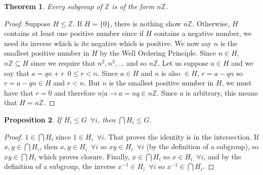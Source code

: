 \documentclass{article}
\newcommand{\Z}{\mathbb{Z}}
\newtheorem{theorem}{Theorem}[section]
\newtheorem{proposition}[theorem]{Proposition}
\theoremstyle{definition}
\begin{document}
\begin{theorem}
    Every subgroup of $\Z$ is of the form $n\Z$.
\end{theorem}
\begin{proof}
    Suppose $H \leq \Z$. If $H=\{0\}$, there is nothing show $n\Z$. Otherwise, $H$ contains at least one positive number since if $H$ contains a negative number, we need its inverse which is its negative which is positive. We now say $n$ is the smallest positive number in $H$ by the Well Ordering Principle. Since $n\in H$, $n\Z \subseteq H$ since we require that $n^2,n^3,\ldots$ and so $n\Z$. Let us suppose $a\in H$ and we say that $a=qn+r \,\,\, 0\leq r<n$. Since $a\in H$ and $n$ is also $\in H$, $r=a-qn$ so $r=a-qn \in H$ and $r<n$. But $n$ is the smallest positive number in $H$, we must have that $r=0$ and therefore $n|a\rightarrow a=nq\in n\Z$. Since $a$ is arbitrary, this means that $H=n\Z$.
\end{proof}
\begin{proposition}
    If $H_i \leq G \,\,\, \forall i$, then $\bigcap H_i \leq G$. 
\end{proposition}
\begin{proof}
    $1\in \bigcap H_i$ since $1\in H_i\,\,\, \forall i$. That proves the identity is in the intersection. If $x,y\in \bigcap H_i$, then $x,y\in H_i \,\,\, \forall i$ so $xy\in H_i \,\,\, \forall i$ (by the definition of a subgroup), so $xy\in \bigcap H_i$ which proves closure. Finally, $x\in \bigcap H_i$ so $x\in H_i \,\,\, \forall i$, and by the definition of a subgroup, the inverse $x^{-1} \in H_i \,\,\, \forall i$ so $x^{-1} \in \bigcap H_i$.
\end{proof}
\end{document}
